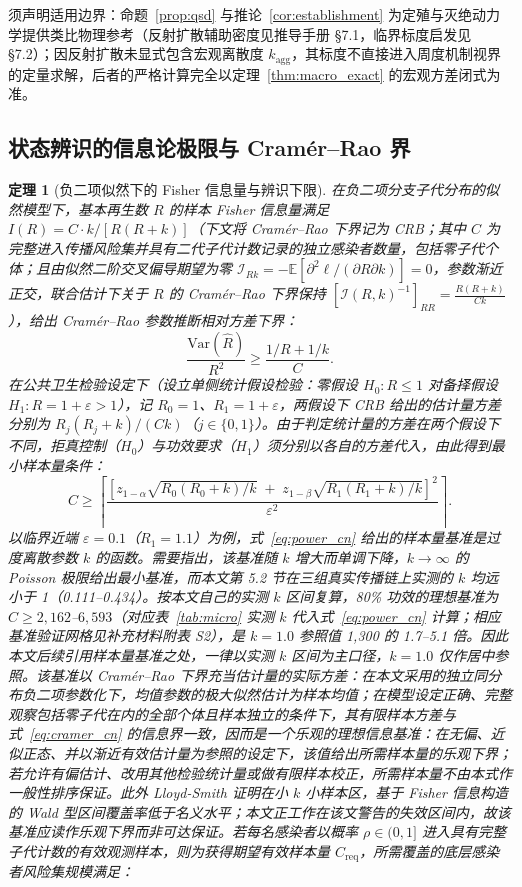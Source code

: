 \documentclass[11pt,a4paper]{article}
\theoremstyle{plain}
\newtheorem{theorem}{定理}
\theoremstyle{definition}
\begin{document}
须声明适用边界：命题~\ref{prop:qsd} 与推论~\ref{cor:establishment} 为定殖与灭绝动力学提供类比物理参考（反射扩散辅助密度见推导手册 §7.1，临界标度启发见 §7.2）；因反射扩散未显式包含宏观离散度 $k_{\text{agg}}$，其标度不直接进入周度机制视界的定量求解，后者的严格计算完全以定理~\ref{thm:macro_exact} 的宏观方差闭式为准。

\subsection{状态辨识的信息论极限与 Cramér--Rao 界}

\begin{theorem}[负二项似然下的 Fisher 信息量与辨识下限]\label{thm:fisher}
在负二项分支子代分布的似然模型下，基本再生数 $R$ 的样本 Fisher 信息量满足 $I(R) = C \cdot k / [R(R+k)]$（下文将 Cramér--Rao 下界记为 CRB；其中 $C$ 为完整进入传播风险集并具有二代子代计数记录的独立感染者数量，包括零子代个体；且由似然二阶交叉偏导期望为零 $\mathcal{I}_{Rk} = -\mathbb{E}[\partial^2 \ell / (\partial R \partial k)] = 0$，参数渐近正交，联合估计下关于 $R$ 的 Cramér--Rao 下界保持 $[\mathcal{I}(R,k)^{-1}]_{RR} = \frac{R(R+k)}{Ck}$），给出 Cramér--Rao 参数推断相对方差下界：
\begin{equation}
\frac{\text{Var}(\hat{R})}{R^2} \ge \frac{1/R + 1/k}{C}.
\label{eq:cramer_cn}
\end{equation}
在公共卫生检验设定下（设立单侧统计假设检验：零假设 $H_0: R \le 1$ 对备择假设 $H_1: R = 1 + \varepsilon > 1$），记 $R_0 = 1$、$R_1 = 1 + \varepsilon$，两假设下 CRB 给出的估计量方差分别为 $R_j(R_j+k)/(Ck)$（$j \in \{0,1\}$）。由于判定统计量的方差在两个假设下不同，拒真控制（$H_0$）与功效要求（$H_1$）须分别以各自的方差代入，由此得到最小样本量条件：
\begin{equation}
C \ge \left\lceil \frac{\left[z_{1-\alpha}\sqrt{R_0(R_0+k)/k} \;+\; z_{1-\beta}\sqrt{R_1(R_1+k)/k}\right]^2}{\varepsilon^2} \right\rceil .
\label{eq:power_cn}
\end{equation}
以临界近端 $\varepsilon = 0.1$（$R_1 = 1.1$）为例，式~\eqref{eq:power_cn} 给出的样本量基准是过度离散参数 $k$ 的函数。需要指出，该基准随 $k$ 增大而单调下降，$k \to \infty$ 的 Poisson 极限给出最小基准，而本文第 5.2 节在三组真实传播链上实测的 $k$ 均远小于 1（0.111--0.434）。按本文自己的实测 $k$ 区间复算，80\% 功效的理想基准为 $C \ge 2{,}162$--$6{,}593$（对应表~\ref{tab:micro} 实测 $k$ 代入式~\eqref{eq:power_cn} 计算；相应基准验证网格见补充材料附表 S2），是 $k = 1.0$ 参照值 1,300 的 1.7--5.1 倍。因此本文后续引用样本量基准之处，一律以实测 $k$ 区间为主口径，$k=1.0$ 仅作居中参照。该基准以 Cramér--Rao 下界充当估计量的实际方差：在本文采用的独立同分布负二项参数化下，均值参数的极大似然估计为样本均值；在模型设定正确、完整观察包括零子代在内的全部个体且样本独立的条件下，其有限样本方差与式~\eqref{eq:cramer_cn} 的信息界一致，因而是一个乐观的理想信息基准：在无偏、近似正态、并以渐近有效估计量为参照的设定下，该值给出所需样本量的乐观下界；若允许有偏估计、改用其他检验统计量或做有限样本校正，所需样本量不由本式作一般性排序保证。此外 Lloyd-Smith\citep{lloyd-smith2007fisher} 证明在小 $k$ 小样本区，基于 Fisher 信息构造的 Wald 型区间覆盖率低于名义水平；本文正工作在该文警告的失效区间内，故该基准应读作乐观下界而非可达保证。若每名感染者以概率 $\rho \in (0, 1]$ 进入具有完整子代计数的有效观测样本，则为获得期望有效样本量 $C_{\text{req}}$，所需覆盖的底层感染者风险集规模满足：

\end{theorem}
\end{document}

